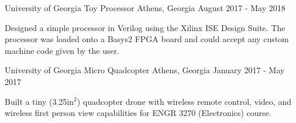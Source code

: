 \begin{cventries}
  \cventry
    {University of Georgia}
    {Toy Processor}
    {Athens, Georgia}
    {August 2017 - May 2018}
    {
      \begin{cvitems}
        \item {Designed a simple processor in Verilog using the Xilinx ISE Design Suite. The processor was loaded onto a Basys2 FPGA board and could accept any custom machine code given by the user.}
      \end{cvitems}
    }
  \cventry
    {University of Georgia}
    {Micro Quadcopter}
    {Athens, Georgia}
    {January 2017 - May 2017}
    {
      \begin{cvitems}
        \item {Built a tiny (3.25in$^{2}$) quadcopter drone with wireless remote control, video, and wireless first person view capabilities for ENGR 3270 (Electronics) course.}
      \end{cvitems}
    }
\end{cventries}